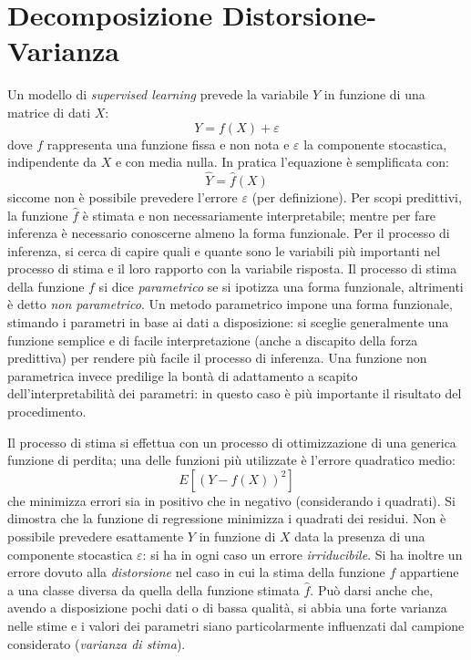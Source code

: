 \documentclass[12pt, a4page]{article}
\begin{document}
\part{Decomposizione Distorsione-Varianza}
Un modello di \textit{supervised learning} prevede la variabile $Y$ in funzione di una matrice di dati $X$:
\begin{equation*}
  Y = f(X) + \varepsilon
\end{equation*}
dove $f$ rappresenta una funzione fissa e non nota e $\varepsilon$ la componente stocastica, indipendente da $X$ e con media nulla.
In pratica l'equazione è semplificata con:
\begin{equation*}
  \hat{Y} = \hat{f}(X)
\end{equation*}
siccome non è possibile prevedere l'errore $\varepsilon$ (per definizione).
Per scopi predittivi, la funzione $\hat{f}$ è stimata e non necessariamente interpretabile; mentre per fare inferenza è necessario conoscerne almeno la forma funzionale.
Per il processo di inferenza, si cerca di capire quali e quante sono le variabili più importanti nel processo di stima e il loro rapporto con la variabile risposta.
Il processo di stima della funzione $f$ si dice \textit{parametrico} se si ipotizza una forma funzionale, altrimenti è detto \textit{non parametrico}.
Un metodo parametrico impone una forma funzionale, stimando i parametri in base ai dati a disposizione: si sceglie generalmente una funzione semplice e di facile interpretazione (anche a discapito della forza predittiva) per rendere più facile il processo di inferenza.
Una funzione non parametrica invece predilige la bontà di adattamento a scapito dell'interpretabilità dei parametri: in questo caso è più importante il risultato del procedimento. \newline

Il processo di stima si effettua con un processo di ottimizzazione di una generica funzione di perdita; una delle funzioni più utilizzate è l'errore quadratico medio:
\begin{equation*}
  E[(Y - f(X))^2]
\end{equation*}
che minimizza errori sia in positivo che in negativo (considerando i quadrati).
Si dimostra che la funzione di regressione minimizza i quadrati dei residui.
Non è possibile prevedere esattamente $Y$ in funzione di $X$ data la presenza di una componente stocastica $\varepsilon$: si ha in ogni caso un errore \textit{irriducibile}.
Si ha inoltre un errore dovuto alla \textit{distorsione} nel caso in cui la stima della funzione $f$ appartiene a una classe diversa da quella della funzione stimata $\hat{f}$.
Può darsi anche che, avendo a disposizione pochi dati o di bassa qualità, si abbia una forte varianza nelle stime e i valori dei parametri siano particolarmente influenzati dal campione considerato (\textit{varianza di stima}). \newline
\end{document}
